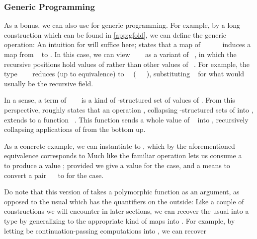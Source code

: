 \subsubsection{Generic Programming}
As a bonus, we can also use  for generic programming. For example, by a long construction which can be found in \autoref{app:gfold}, we can define the generic  operation:
An intuition for  will suffice here;  states that a map  of \ \ \ \ \  induces a map from \  to . In this case, we can view \ \ \  as a variant of \ , in which the recursive positions hold values of  rather than other values of \ . For example, the type \ \ \  reduces (up to equivalence) to \ \ (\ \ \ ), substituting \  for what would usually be the recursive field.

In a sense, a term of \ \ \  is a kind of -structured set of values of . From this perspective,  roughly states that an operation , collapsing -structured sets of  into , extends to a function \ . This function sends a whole value of \  into , recursively collapsing applications of  from the bottom up.

As a concrete example, we can instantiate  to , which by the aforementioned equivalence corresponds to
Much like the familiar  operation lets us consume a \  to produce a value ; provided we give a value  for the \AIC{[]} case, and a means to convert a pair \ \  to  for the  case.

Do note that this version of  takes a polymorphic function as an argument, as opposed to the usual  which has the quantifiers on the outside:
Like a couple of constructions we will encounter in later sections, we can recover the usual  into a type  by generalizing  to the appropriate kind of maps into . For example, by letting  be continuation-passing computations into \bN{}, we can recover


